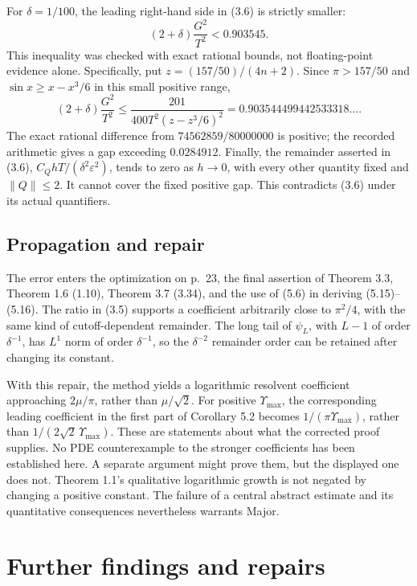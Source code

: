 \documentclass[10pt]{article}
\begin{document}
For \(\delta=1/100\), the leading right-hand side in (3.6) is strictly smaller: \[(2+\delta)\frac{G^2}{T^2}<0.903545.\] This inequality was checked with exact rational bounds, not floating-point evidence alone. Specifically, put \(z=(157/50)/(4n+2)\). Since \(\pi>157/50\) and \(\sin x\geq x-x^3/6\) in this small positive range, \[(2+\delta)\frac{G^2}{T^2}
 \leq\frac{201}{400T^2(z-z^3/6)^2}
 =0.903544499442533318\ldots .\] The exact rational difference from \(74562859/80000000\) is positive; the recorded arithmetic gives a gap exceeding \(0.0284912\). Finally, the remainder asserted in (3.6), \(C_QhT/(\delta^2\varepsilon^2)\), tends to zero as \(h\to0\), with every other quantity fixed and \(\left\|Q\right\|\leq2\). It cannot cover the fixed positive gap. This contradicts (3.6) under its actual quantifiers.\par
\subsection*{Propagation and repair}
The error enters the optimization on p. 23, the final assertion of Theorem 3.3, Theorem 1.6 (1.10), Theorem 3.7 (3.34), and the use of (5.6) in deriving (5.15)–(5.16). The ratio in (3.5) supports a coefficient arbitrarily close to \(\pi^2/4\), with the same kind of cutoff-dependent remainder. The long tail of \(\psi_L\), with \(L-1\) of order \(\delta^{-1}\), has \(L^1\) norm of order \(\delta^{-1}\), so the \(\delta^{-2}\) remainder order can be retained after changing its constant.\par
With this repair, the method yields a logarithmic resolvent coefficient approaching \(2\mu/\pi\), rather than \(\mu/\sqrt2\). For positive \(\Upsilon_{\max}\), the corresponding leading coefficient in the first part of Corollary 5.2 becomes \(1/(\pi\Upsilon_{\max})\), rather than \(1/(2\sqrt2\,\Upsilon_{\max})\). These are statements about what the corrected proof supplies. No PDE counterexample to the stronger coefficients has been established here. A separate argument might prove them, but the displayed one does not. Theorem 1.1’s qualitative logarithmic growth is not negated by changing a positive constant. The failure of a central abstract estimate and its quantitative consequences nevertheless warrants Major.\par
\section*{Further findings and repairs}
\end{document}
